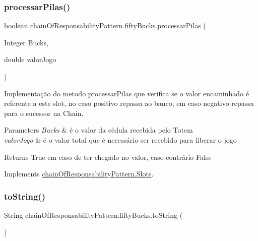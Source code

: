 \subsubsection{\texorpdfstring{processarPilas()}{processarPilas()}}
{\footnotesize\ttfamily boolean chain\+Of\+Responsability\+Pattern.\+fifty\+Bucks.\+processar\+Pilas (\begin{DoxyParamCaption}\item[{Integer}]{Bucks,  }\item[{double}]{valor\+Jogo }\end{DoxyParamCaption})}



Implementação do metodo processar\+Pilas que verifica se o valor encaminhado é referente a este slot, no caso positivo repassa ao banco, em caso negativo repassa para o sucessor na Chain. 


\begin{DoxyParams}{Parameters}
{\em Bucks} & é o valor da cédula recebida pelo Totem \\
\hline
{\em valor\+Jogo} & é o valor total que é necessário ser recebido para liberar o jogo \\
\hline
\end{DoxyParams}
\begin{DoxyReturn}{Returns}
True em caso de ter chegado no valor, caso contrário False 
\end{DoxyReturn}


Implements \mbox{\hyperlink{interfacechain_of_responsability_pattern_1_1_slots_ade54039583c4faf4126847fe7c143862}{chain\+Of\+Responsability\+Pattern.\+Slots}}.

\mbox{\label{classchain_of_responsability_pattern_1_1fifty_bucks_a374ee3efc8a2989bb48178190c6321f3}} 
\subsubsection{\texorpdfstring{toString()}{toString()}}
{\footnotesize\ttfamily String chain\+Of\+Responsability\+Pattern.\+fifty\+Bucks.\+to\+String (\begin{DoxyParamCaption}{ }\end{DoxyParamCaption})}



